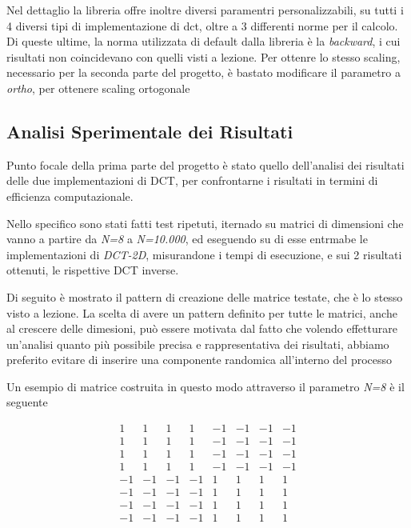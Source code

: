 Nel dettaglio la libreria offre inoltre diversi paramentri personalizzabili, su tutti i 4 diversi tipi di implementazione di dct, oltre a 3 differenti norme per il calcolo.\\
Di queste ultime, la norma utilizzata di default dalla libreria è la \textit{backward}, i cui risultati non coincidevano con quelli visti a lezione. Per ottenre lo stesso scaling, necessario per la seconda parte del progetto, è bastato modificare il parametro a \textit{ortho}, per ottenere scaling ortogonale

\subsection{Analisi Sperimentale dei Risultati}
Punto focale della prima parte del progetto è stato quello dell'analisi dei risultati delle due implementazioni di DCT, per confrontarne i risultati in termini di efficienza computazionale.

Nello specifico sono stati fatti test ripetuti, iternado su matrici di dimensioni che vanno a partire da \textit{N=8} a \textit{N=10.000}, ed eseguendo su di esse entrmabe le implementazioni di \textit{DCT-2D}, misurandone i tempi di esecuzione, e sui 2 risultati ottenuti, le rispettive DCT inverse.

Di seguito è mostrato il pattern di creazione delle matrice testate, che è lo stesso visto a lezione. La scelta di avere un pattern definito per tutte le matrici, anche al crescere delle dimesioni, può essere motivata dal fatto che volendo effetturare un'analisi quanto più possibile precisa e rappresentativa dei risultati, abbiamo preferito evitare di inserire una componente randomica all'interno del processo



Un esempio di matrice costruita in questo modo attraverso il parametro \textit{N=8} è il seguente

\[
\begin{matrix}
       1  &       1  &       1  &       1  &     -1  &     -1  &     -1  &     -1 \\
       1  &       1  &       1  &       1  &     -1  &     -1  &     -1  &     -1 \\
       1  &       1  &       1  &       1  &     -1  &     -1  &     -1  &     -1 \\
       1  &       1  &       1  &       1  &     -1  &     -1  &     -1  &     -1 \\
     -1  &     -1  &     -1  &     -1  &       1  &       1  &       1  &       1 \\
     -1  &     -1  &     -1  &     -1  &       1  &       1  &       1  &       1 \\
     -1  &     -1  &     -1  &     -1  &       1  &       1  &       1  &       1 \\
     -1  &     -1  &     -1  &     -1  &       1  &       1  &       1  &       1
\end{matrix}
\]

